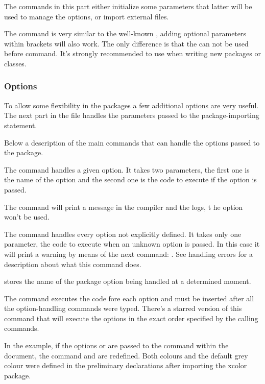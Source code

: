 The commands in this part either initialize some parameters 
that latter will be used to manage the options, 
or import external files.

The command  is very similar to the 
well-known , adding optional parameters 
within brackets will also work. The only difference is that 
the  can not be used before 
 command. It's strongly recommended 
to use  when writing new packages or 
classes.

\subsubsection{Options}

To allow some flexibility in the packages a few additional 
options are very useful. The next part in the file handles 
the parameters passed to the package-importing statement.

Below a description of the main commands that can handle the options passed to the package.

The command  handles a given option. It takes two parameters, 
the first one is the name of the option and the second one is the code to execute if the 
option is passed.

The command  will print a message in the compiler and the logs, t
he option won't be used.

The command  handles every option not explicitly defined. 
It takes only one parameter, the code to execute when an unknown option is passed. 
In this case it will print a warning by means of the next command:
. See handling errors for a description about what this command does.

 stores the name of the package option being handled at a determined moment.

The command  executes the code fore each option and must be 
inserted after all the option-handling commands were typed. 
There's a starred version of this command that will execute 
the options in the exact order specified by the calling commands.

In the example, if the options  or  are passed to the 
 command within the document, the command  and  are redefined. 
 Both colours and the default grey colour were defined in the preliminary declarations after importing the xcolor package.

